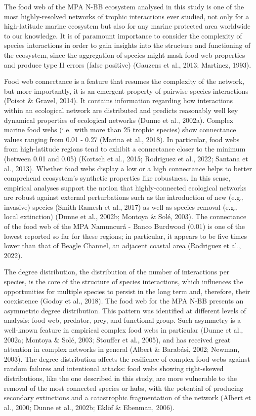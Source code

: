 \documentclass[preprint, 3p,
authoryear]{elsarticle} %
\begin{document}
The food web of the MPA N-BB ecosystem analysed in this study is one of
the most highly-resolved networks of trophic interactions ever studied,
not only for a high-latitude marine ecosystem but also for any marine
protected area worldwide to our knowledge. It is of paramount importance
to consider the complexity of species interactions in order to gain
insights into the structure and functioning of the ecosystem, since the
aggregation of species might mask food web properties and produce type
II errors (false positive) (Gauzens et al., 2013; Martinez, 1993).

Food web connectance is a feature that resumes the complexity of the
network, but more importantly, it is an emergent property of pairwise
species interactions (Poisot \& Gravel, 2014). It contains information
regarding how interactions within an ecological network are distributed
and predicts reasonably well key dynamical properties of ecological
networks (Dunne et al., 2002a). Complex marine food webs (i.e.~with more
than 25 trophic species) show connectance values ranging from 0.01 -
0.27 (Marina et al., 2018). In particular, food webs from high-latitude
regions tend to exhibit a connectance closer to the minimum (between
0.01 and 0.05) (Kortsch et al., 2015; Rodriguez et al., 2022; Santana et
al., 2013). Whether food webs display a low or a high connectance helps
to better comprehend ecosystem's synthetic properties like robustness.
In this sense, empirical analyses support the notion that
highly-connected ecological networks are robust against external
perturbations such as the introduction of new (e.g., invasive) species
(Smith-Ramesh et al., 2017) as well as species removal (e.g., local
extinction) (Dunne et al., 2002b; Montoya \& Solé, 2003). The
connectance of the food web of the MPA Namuncurá - Banco Burdwood (0.01)
is one of the lowest reported so far for these regions; in particular,
it appears to be five times lower than that of Beagle Channel, an
adjacent coastal area (Rodriguez et al., 2022).

The degree distribution, the distribution of the number of interactions
per species, is the core of the structure of species interactions, which
influences the opportunities for multiple species to persist in the long
term and, therefore, their coexistence (Godoy et al., 2018). The food
web for the MPA N-BB presents an asymmetric degree distribution. This
pattern was identified at different levels of analysis: food web,
predator, prey, and functional group. Such asymmetry is a well-known
feature in empirical complex food webs in particular (Dunne et al.,
2002a; Montoya \& Solé, 2003; Stouffer et al., 2005), and has received
great attention in complex networks in general (Albert \& Barabási,
2002; Newman, 2003). The degree distribution affects the resilience of
complex food webs against random failures and intentional attacks: food
webs showing right-skewed distributions, like the one described in this
study, are more vulnerable to the removal of the most connected species
or hubs, with the potential of producing secondary extinctions and a
catastrophic fragmentation of the network (Albert et al., 2000; Dunne et
al., 2002b; Eklöf \& Ebenman, 2006).
\end{document}
